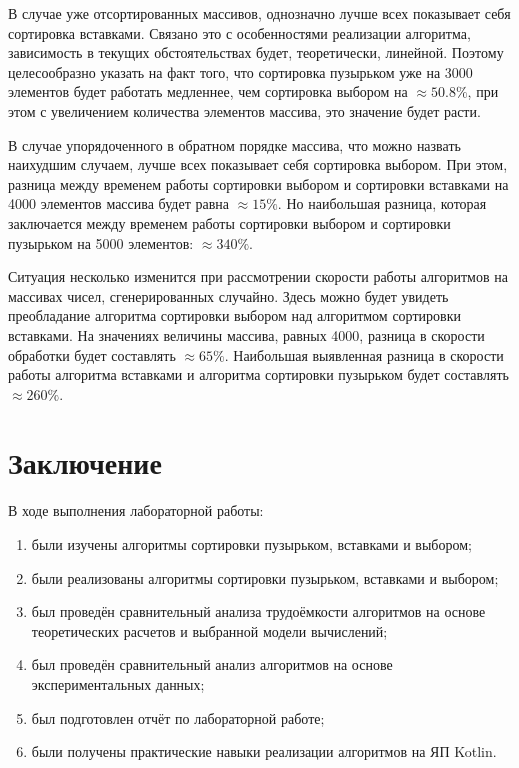 \documentclass[12pt]{report}
\begin{document}
В случае уже отсортированных массивов, однозначно лучше всех показывает себя сортировка вставками. Связано это с особенностями реализации алгоритма, зависимость в текущих обстоятельствах будет, теоретически, линейной. Поэтому целесообразно указать на факт того, что сортировка пузырьком уже на 3000 элементов будет работать медленнее, чем сортировка выбором на  $\approx 50.8 \%$, при этом с увеличением количества элементов массива, это значение будет расти.

В случае упорядоченного в обратном порядке массива, что можно назвать наихудшим случаем, лучше всех показывает себя сортировка выбором. При этом, разница между временем работы сортировки выбором и сортировки вставками на 4000 элементов массива будет равна $\approx 15\%$. Но наибольшая разница, которая заключается между временем работы сортировки выбором и сортировки пузырьком на 5000 элементов: $\approx 340\%$.

Ситуация несколько изменится при рассмотрении скорости работы алгоритмов на массивах чисел, сгенерированных случайно. Здесь можно будет увидеть преобладание алгоритма сортировки выбором над алгоритмом сортировки вставками. На значениях величины массива, равных 4000, разница в скорости обработки будет составлять $\approx 65\%$. Наибольшая выявленная разница в скорости работы алгоритма вставками и алгоритма сортировки пузырьком будет составлять $\approx 260\%$.

\chapter*{Заключение}
В ходе выполнения лабораторной работы:
\begin{enumerate}
\item были изучены алгоритмы сортировки пузырьком, вставками и выбором;
\item были реализованы алгоритмы сортировки пузырьком, вставками и выбором;
\item был проведён сравнительный анализа трудоёмкости алгоритмов на основе теоретических расчетов и выбранной модели вычислений;
\item был проведён сравнительный анализ алгоритмов на основе экспериментальных данных;
\item был подготовлен отчёт по лабораторной работе;
\item были получены практические навыки реализации алгоритмов на ЯП Kotlin.
\end{enumerate}
\end{document}
